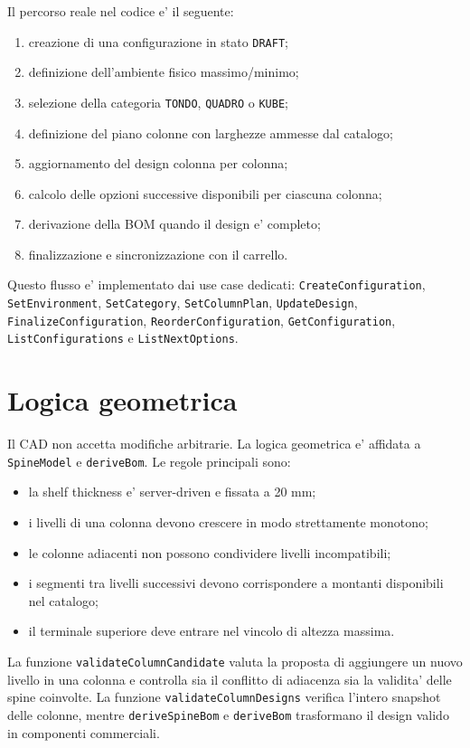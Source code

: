 Il percorso reale nel codice e' il seguente:

\begin{enumerate}
\item creazione di una configurazione in stato \texttt{DRAFT};
\item definizione dell'ambiente fisico massimo/minimo;
\item selezione della categoria \texttt{TONDO}, \texttt{QUADRO} o \texttt{KUBE};
\item definizione del piano colonne con larghezze ammesse dal catalogo;
\item aggiornamento del design colonna per colonna;
\item calcolo delle opzioni successive disponibili per ciascuna colonna;
\item derivazione della BOM quando il design e' completo;
\item finalizzazione e sincronizzazione con il carrello.
\end{enumerate}

Questo flusso e' implementato dai use case dedicati: \texttt{CreateConfiguration}, \texttt{SetEnvironment}, \texttt{SetCategory}, \texttt{SetColumnPlan}, \texttt{UpdateDesign}, \texttt{FinalizeConfiguration}, \texttt{ReorderConfiguration}, \texttt{GetConfiguration}, \texttt{ListConfigurations} e \texttt{ListNextOptions}.

\section{Logica geometrica}

Il CAD non accetta modifiche arbitrarie. La logica geometrica e' affidata a \texttt{SpineModel} e \texttt{deriveBom}. Le regole principali sono:

\begin{itemize}
\item la shelf thickness e' server-driven e fissata a 20 mm;
\item i livelli di una colonna devono crescere in modo strettamente monotono;
\item le colonne adiacenti non possono condividere livelli incompatibili;
\item i segmenti tra livelli successivi devono corrispondere a montanti disponibili nel catalogo;
\item il terminale superiore deve entrare nel vincolo di altezza massima.
\end{itemize}

La funzione \texttt{validateColumnCandidate} valuta la proposta di aggiungere un nuovo livello in una colonna e controlla sia il conflitto di adiacenza sia la validita' delle spine coinvolte. La funzione \texttt{validateColumnDesigns} verifica l'intero snapshot delle colonne, mentre \texttt{deriveSpineBom} e \texttt{deriveBom} trasformano il design valido in componenti commerciali.

